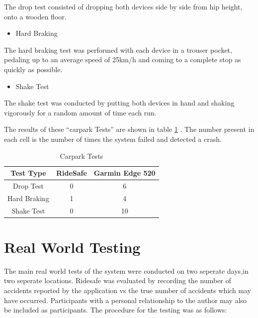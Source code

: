 The drop test consisted of dropping both devices side by side from hip height, onto a wooden floor.


\begin{itemize}
\item Hard Braking
\end {itemize}

The hard braking test was performed with each device in a trouser pocket, pedaling up to an average speed of 25km/h and coming to a complete stop as quickly as possible.



\begin{itemize}
\item Shake Test
\end {itemize}

The shake test was conducted by putting both devices in hand and shaking vigorously for a random amount of time each run.




The results of these “carpark Tests” are shown in table \ref{cpt} . The number present in each cell is the number of times the system failed and detected a crash.


\begin{table}
\caption{Carpark Tests}
\label{cpt}
\begin{center}
 \begin{tabular}{||c | c |c||} 
 \hline
 Test Type & RideSafe & Garmin Edge 520 \\ [0.5ex] 
 \hline\hline
 Drop Test & 0 & 6 \\ 
 \hline
 Hard Braking & 1 & 4\\
 \hline
 Shake Test  & 0 & 10 \\ [1ex] 
 \hline
\end{tabular}
\end{center}
\end{table}




\section{Real World Testing}


The main real world tests of the system were conducted on two seperate days,in two seperate locations. Ridesafe was evaluated by recording the number of accidents reported by the application vs the true number of accidents which may have occurred. Participants with a personal relationship to the author may also be included as participants. The procedure for the testing was as follows:

